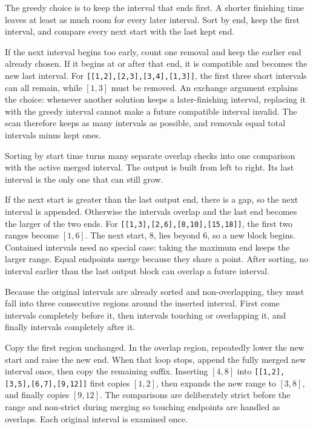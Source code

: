 \expandafter\def\csname sourcewalkthrough@38\endcsname{%
The greedy choice is to keep the interval that ends first. A shorter finishing
time leaves at least as much room for every later interval. Sort by end, keep
the first interval, and compare every next start with the last kept end.

If the next interval begins too early, count one removal and keep the earlier
end already chosen. If it begins at or after that end, it is compatible and
becomes the new last interval. For \texttt{[[1,2],[2,3],[3,4],[1,3]]}, the
first three short intervals can all remain, while \([1,3]\) must be removed.
An exchange argument explains the choice: whenever another solution keeps a
later-finishing interval, replacing it with the greedy interval cannot make a
future compatible interval invalid. The scan therefore keeps as many
intervals as possible, and removals equal total intervals minus kept ones.}

\expandafter\def\csname sourcewalkthrough@39\endcsname{%
Sorting by start time turns many separate overlap checks into one comparison
with the active merged interval. The output is built from left to right. Its
last interval is the only one that can still grow.

If the next start is greater than the last output end, there is a gap, so the
next interval is appended. Otherwise the intervals overlap and the last end
becomes the larger of the two ends. For \texttt{[[1,3],[2,6],[8,10],[15,18]]},
the first two ranges become \([1,6]\). The next start, 8, lies beyond 6, so a
new block begins. Contained intervals need no special case: taking the maximum
end keeps the larger range. Equal endpoints merge because they share a point.
After sorting, no interval earlier than the last output block can overlap a
future interval.}

\expandafter\def\csname sourcewalkthrough@40\endcsname{%
Because the original intervals are already sorted and non-overlapping, they
must fall into three consecutive regions around the inserted interval. First
come intervals completely before it, then intervals touching or overlapping
it, and finally intervals completely after it.

Copy the first region unchanged. In the overlap region, repeatedly lower the
new start and raise the new end. When that loop stops, append the fully merged
new interval once, then copy the remaining suffix. Inserting \([4,8]\) into
\texttt{[[1,2],[3,5],[6,7],[9,12]]} first copies \([1,2]\), then expands the
new range to \([3,8]\), and finally copies \([9,12]\). The comparisons are
deliberately strict before the range and non-strict during merging so touching
endpoints are handled as overlaps. Each original interval is examined once.}

